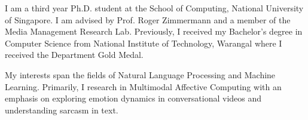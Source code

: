 

\begin{cvparagraph}

I am a third year Ph.D. student at the School of Computing, National University of Singapore. I am advised by Prof. Roger Zimmermann and a member of the Media Management Research Lab. Previously, I received my Bachelor's degree in Computer Science from National Institute of Technology, Warangal where I received the Department Gold Medal.

My interests span the fields of Natural Language Processing and Machine Learning. Primarily, I research in Multimodal Affective Computing with an emphasis on exploring emotion dynamics in conversational videos and understanding sarcasm in text.
\end{cvparagraph}
